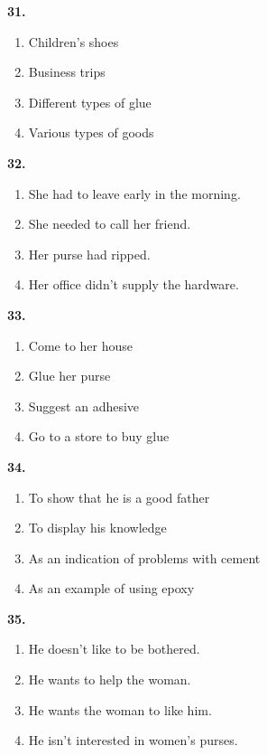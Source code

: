 \documentclass[12pt]{article}
\begin{document}
\noindent\textbf{31.}
\begin{enumerate}[label=(\Alph*),leftmargin=*,itemsep=0.2em]
\item Children's shoes
\item Business trips
\item Different types of glue
\item Various types of goods
\end{enumerate}
\par
\vspace{0.25\baselineskip}
\noindent\textbf{32.}
\begin{enumerate}[label=(\Alph*),leftmargin=*,itemsep=0.2em]
\item She had to leave early in the morning.
\item She needed to call her friend.
\item Her purse had ripped.
\item Her office didn't supply the hardware.
\end{enumerate}
\par
\vspace{0.25\baselineskip}
\noindent\textbf{33.}
\begin{enumerate}[label=(\Alph*),leftmargin=*,itemsep=0.2em]
\item Come to her house
\item Glue her purse
\item Suggest an adhesive
\item Go to a store to buy glue
\end{enumerate}
\par
\vspace{0.25\baselineskip}
\noindent\textbf{34.}
\begin{enumerate}[label=(\Alph*),leftmargin=*,itemsep=0.2em]
\item To show that he is a good father
\item To display his knowledge
\item As an indication of problems with cement
\item As an example of using epoxy
\end{enumerate}
\par
\vspace{0.25\baselineskip}
\noindent\textbf{35.}
\begin{enumerate}[label=(\Alph*),leftmargin=*,itemsep=0.2em]
\item He doesn't like to be bothered.
\item He wants to help the woman.
\item He wants the woman to like him.
\item He isn't interested in women's purses.
\end{enumerate}
\end{document}
